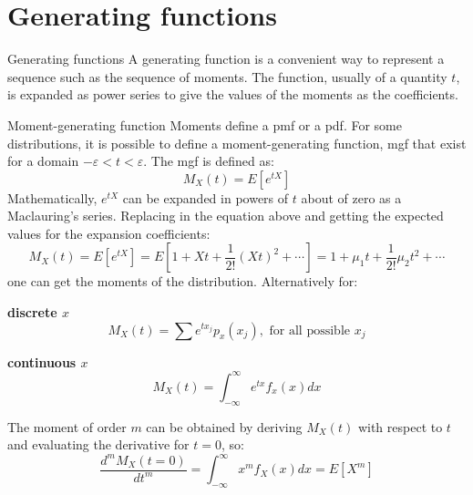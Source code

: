 \documentclass[8pt]{beamer}
\renewcommand{\emph}[1]{\textcolor{myorange}{#1}}
\begin{document}
\section{Generating functions}
\begin{frame}{Generating functions}
    A \alert{generating function} is a convenient way to represent a sequence such as the sequence of moments. The function, usually of a quantity $t$, is expanded as \emph{power series} to give the values of the moments as the coefficients. 

    \begin{block}{Moment-generating function}
        \emph{Moments} define a \emph{pmf} or a \emph{pdf}. For some distributions, it is possible to define a \alert{moment-generating function}, \alert{mgf} that exist for a domain $-\varepsilon < t < \varepsilon$. The \emph{mgf} is defined as:
        \[
            M_X (t)  = E[e^{tX}]
        \]
        Mathematically, $e^{tX}$ can be expanded in powers of $t$ about of zero as a Maclauring's series. Replacing in the equation above and getting the expected values for the expansion coefficients:
\[
    M_X (t)  = E[e^{tX}] = E \left[ 1 + Xt + \frac{1}{2!} (Xt)^2 + \cdots \right] = 1 + \mu_1 t + \frac{1}{2!}\mu_2 t^2 + \cdots 
        \]
        one can get the moments of the distribution. Alternatively for:
\begin{minipage}[t]{0.44\textwidth}
\centering
\textbf{discrete $x$}
\[
    M_X (t) = \sum e^{t x_j} p_x (x_j), \text{ for all possible $x_j$}
\]
\end{minipage}
\begin{minipage}[t]{0.44\textwidth}
\centering
\textbf{continuous $x$}
\[
    M_X (t) = \int_{-\infty}^{\infty} e^{t x} f_x (x) dx
\]

\end{minipage}

The \emph{moment of order $m$} can be obtained by deriving $M_X (t)$ with respect to $t$ and evaluating the derivative for $t=0$, so:
\[
    \frac{d^m M_X (t=0)}{d t^m} = \int_{-\infty}^{\infty} x^m f_X (x) dx = E[X^m]
\]

    \end{block}
\end{frame}
\end{document}
